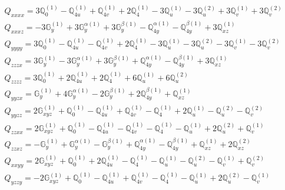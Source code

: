 \documentclass[fleqn,8pt,landscape]{jsarticle}
\begin{document}
\begin{align*}
& Q_{xxxx} = 3 \mathbb{Q}_{0}^{(1)} - \mathbb{Q}_{4u}^{(1)} + \mathbb{Q}_{4v}^{(1)} + 2 \mathbb{Q}_{4}^{(1)} - 3 \mathbb{Q}_{u}^{(1)} - 3 \mathbb{Q}_{u}^{(2)} + 3 \mathbb{Q}_{v}^{(1)} + 3 \mathbb{Q}_{v}^{(2)} \\
& Q_{xxxz} = - 3 \mathbb{G}_{y}^{(1)} + 3 \mathbb{G}_{y}^{\alpha(1)} + 3 \mathbb{G}_{y}^{\beta(1)} - \mathbb{Q}_{4y}^{\alpha(1)} - \mathbb{Q}_{4y}^{\beta(1)} + 3 \mathbb{Q}_{xz}^{(1)} \\
& Q_{yyyy} = 3 \mathbb{Q}_{0}^{(1)} - \mathbb{Q}_{4u}^{(1)} - \mathbb{Q}_{4v}^{(1)} + 2 \mathbb{Q}_{4}^{(1)} - 3 \mathbb{Q}_{u}^{(1)} - 3 \mathbb{Q}_{u}^{(2)} - 3 \mathbb{Q}_{v}^{(1)} - 3 \mathbb{Q}_{v}^{(2)} \\
& Q_{zzzx} = 3 \mathbb{G}_{y}^{(1)} - 3 \mathbb{G}_{y}^{\alpha(1)} + 3 \mathbb{G}_{y}^{\beta(1)} + \mathbb{Q}_{4y}^{\alpha(1)} - \mathbb{Q}_{4y}^{\beta(1)} + 3 \mathbb{Q}_{xz}^{(1)} \\
& Q_{zzzz} = 3 \mathbb{Q}_{0}^{(1)} + 2 \mathbb{Q}_{4u}^{(1)} + 2 \mathbb{Q}_{4}^{(1)} + 6 \mathbb{Q}_{u}^{(1)} + 6 \mathbb{Q}_{u}^{(2)} \\
& Q_{yyzx} = \mathbb{G}_{y}^{(1)} + 4 \mathbb{G}_{y}^{\alpha(1)} - 2 \mathbb{G}_{y}^{\beta(1)} + 2 \mathbb{Q}_{4y}^{\beta(1)} + \mathbb{Q}_{xz}^{(1)} \\
& Q_{yyzz} = 2 \mathbb{G}_{xyz}^{(1)} + \mathbb{Q}_{0}^{(1)} - \mathbb{Q}_{4u}^{(1)} + \mathbb{Q}_{4v}^{(1)} - \mathbb{Q}_{4}^{(1)} + 2 \mathbb{Q}_{u}^{(1)} - \mathbb{Q}_{u}^{(2)} - \mathbb{Q}_{v}^{(2)} \\
& Q_{zzxx} = 2 \mathbb{G}_{xyz}^{(1)} + \mathbb{Q}_{0}^{(1)} - \mathbb{Q}_{4u}^{(1)} - \mathbb{Q}_{4v}^{(1)} - \mathbb{Q}_{4}^{(1)} - \mathbb{Q}_{u}^{(1)} + 2 \mathbb{Q}_{u}^{(2)} + \mathbb{Q}_{v}^{(1)} \\
& Q_{zzxz} = - \mathbb{G}_{y}^{(1)} + \mathbb{G}_{y}^{\alpha(1)} - \mathbb{G}_{y}^{\beta(1)} + \mathbb{Q}_{4y}^{\alpha(1)} - \mathbb{Q}_{4y}^{\beta(1)} + \mathbb{Q}_{xz}^{(1)} + 2 \mathbb{Q}_{xz}^{(2)} \\
& Q_{xxyy} = 2 \mathbb{G}_{xyz}^{(1)} + \mathbb{Q}_{0}^{(1)} + 2 \mathbb{Q}_{4u}^{(1)} - \mathbb{Q}_{4}^{(1)} - \mathbb{Q}_{u}^{(1)} - \mathbb{Q}_{u}^{(2)} - \mathbb{Q}_{v}^{(1)} + \mathbb{Q}_{v}^{(2)} \\
& Q_{yzzy} = - 2 \mathbb{G}_{xyz}^{(1)} + \mathbb{Q}_{0}^{(1)} - \mathbb{Q}_{4u}^{(1)} + \mathbb{Q}_{4v}^{(1)} - \mathbb{Q}_{4}^{(1)} - \mathbb{Q}_{u}^{(1)} + 2 \mathbb{Q}_{u}^{(2)} - \mathbb{Q}_{v}^{(1)} \\

\end{align*}
\end{document}
